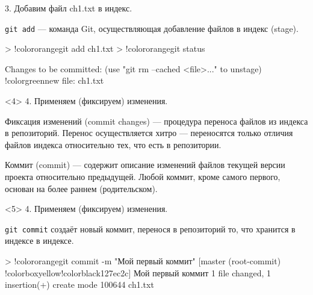 \documentclass[9pt, aspectratio=1610]{beamer}
\begin{document}
\begin{frame}[fragile]
\begin{minipage}[t][\paperheight-3cm][t]{0.68\linewidth}
\begin{minipage}[t][5.2cm][t]{\linewidth}
\begin{onlyenv}
				3. Добавим файл ch1.txt в индекс.
				
				\begin{alertblock}{\Verb|git add| ---}
					команда Git, осуществляющая добавление файлов в индекс (stage).
				\end{alertblock}
				
				\begin{VerbatimCmd}[gobble=5,fontsize=\small]
					
					> !color{orange}git add ch1.txt 
					> !color{orange}git status
					
					Changes to be committed:
					  (use "git rm --cached <file>..." to unstage)
						!color{green}new file:   ch1.txt					
					
				\end{VerbatimCmd}
								
			\end{onlyenv}%
			\begin{onlyenv}<4>%
				4. Применяем (фиксируем) изменения.
				
				\begin{alertblock}{Фиксация изменений (commit changes) --- }
				процедура переноса файлов из индекса в репозиторий. Перенос осуществляется хитро --- переносятся только отличия файлов индекса относительно тех, что есть в репозитории.		
				\end{alertblock}
				
				\begin{alertblock}{Коммит (commit) --- }
					содержит описание изменений файлов текущей версии проекта относительно предыдущей. Любой коммит, кроме самого первого, основан на более раннем (родительском).   		
				\end{alertblock}
				
			\end{onlyenv}%
			\begin{onlyenv}<5>%
				4. Применяем (фиксируем) изменения.
					
				\begin{alertblock}{\Verb|git commit|}
					создаёт новый коммит, перенося в репозиторий то, что хранится в индексе в индексе. 
				\end{alertblock}
				
				\begin{VerbatimCmd}[gobble=5]
					
					> !color{orange}git commit -m "Мой первый коммит"	
					[master (root-commit) !colorbox{yellow}{!color{black}127e}c2c] Мой первый коммит
					1 file changed, 1 insertion(+)
					create mode 100644 ch1.txt
					

\end{VerbatimCmd}
\end{onlyenv}
\end{minipage}
\end{minipage}
\end{frame}
\end{document}
